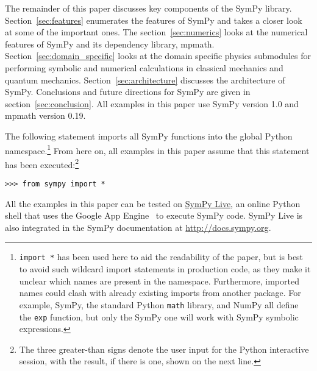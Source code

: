 The remainder of this paper discusses key components of the SymPy library.
Section~\ref{sec:features} enumerates the features of SymPy and takes a closer
look at some of the important ones. The section~\ref{sec:numerics} looks at
the numerical features of SymPy and its dependency library, mpmath.
Section~\ref{sec:domain_specific} looks at the domain specific physics
submodules for performing symbolic and numerical calculations in classical
mechanics and quantum mechanics. Section~\ref{sec:architecture} discusses the
architecture of SymPy. Conclusions and future directions for SymPy are given
in section~\ref{sec:conclusion}. All examples in this paper use SymPy version
1.0 and mpmath version 0.19.

The following statement imports all SymPy functions into the global Python
namespace.\footnote{\texttt{import *} has been used here to aid the
  readability of the paper, but is best to avoid such wildcard import
  statements in production code, as they make it unclear which names are
  present in the namespace. Furthermore, imported names could clash with
  already existing imports from another package. For example, SymPy, the
  standard Python \texttt{math} library, and NumPy all define the \texttt{exp}
  function, but only the SymPy one will work with SymPy symbolic expressions.}
From here on, all examples in this paper assume that this statement has been
executed:\footnote{\label{note:prompt} The three greater-than signs denote the user input for the
  Python interactive session, with the result, if there is one, shown on the
  next line.}

\begin{verbatim}
>>> from sympy import *
\end{verbatim}

All the examples in this paper can be tested on
\href{http://live.sympy.org}{SymPy Live}, an online Python shell that uses the
Google App Engine~\cite{ciurana2009google} to execute SymPy code. SymPy Live
is also integrated in the SymPy documentation at
\href{http://docs.sympy.org}{http://docs.sympy.org}.
